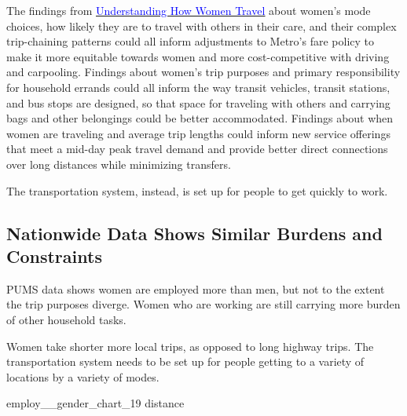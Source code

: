 \documentclass[
  12pt,
]{article}
\newenvironment{Shaded}{\begin{snugshade}}{\end{snugshade}}
\newcommand{\NormalTok}[1]{#1}
\begin{document}
\begin{flushleft}
The findings from \href{https://thesource.metro.net/2019/09/19/metro-releases-understanding-how-women-travel-report/}{\underline{\textcolor{blue}{Understanding How Women Travel}}} about women’s mode choices, how likely they are to travel with others in their care, and their complex trip-chaining patterns could all inform adjustments to Metro’s fare policy to make it more equitable towards women and more cost-competitive with driving and carpooling. Findings about women’s trip purposes and primary responsibility for household errands could all inform the way transit vehicles, transit stations, and bus stops are designed, so that space for traveling with others and carrying bags and other belongings could be better accommodated. Findings about when women are traveling and average trip lengths could inform new service offerings that meet a mid-day peak travel demand and provide better direct connections over long distances while minimizing transfers. 

The transportation system, instead, is set up for people to get quickly to work.
\end{flushleft}

\newpage
\setlength{\headheight}{10pt}
\setlength{\textheight}{665pt}
\fancyhead[L]{}

\hypertarget{nationwide-data-shows-similar-burdens-and-constraints}{%
\subsection{Nationwide Data Shows Similar Burdens and
Constraints}\label{nationwide-data-shows-similar-burdens-and-constraints}}

\begin{flushleft}
PUMS data shows women are employed more than men, but not to the extent the trip purposes diverge. Women who are working are still carrying more burden of other household tasks.
\end{flushleft}

\begin{flushleft}
Women take shorter more local trips, as opposed to long highway trips. The transportation system needs to be set up for people getting to a variety of locations by a variety of modes.
\end{flushleft}

\begin{Shaded}
\begin{Highlighting}[]
\NormalTok{employ\_\_gender\_chart\_19}
\NormalTok{distance}
\end{Highlighting}
\end{Shaded}
\end{document}
